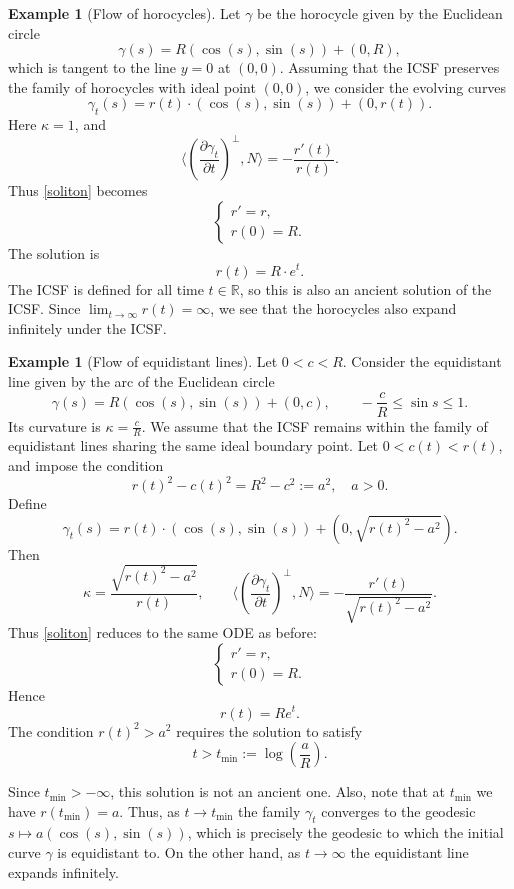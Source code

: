 \documentclass[12pt]{amsart}
\theoremstyle{plain}
\theoremstyle{definition}
\newtheorem{example}[theorem]{Example}
\def\r{\mathbb R}
\begin{document}
\begin{example}[Flow of horocycles]
\label{ex:circle2}
Let $\gamma$ be the horocycle given by the Euclidean circle
$$\gamma(s)=R ( \cos(s),\sin(s))+(0,R),$$
which is tangent to the line $y=0$ at $(0,0)$. Assuming that the ICSF preserves the family of horocycles with ideal point $(0,0)$, we consider the evolving curves
 $$\gamma_t(s) = r(t) \cdot (\cos(s), \sin(s))+(0,r(t)).$$ 
Here $\kappa=1$, and 
$$\langle\left(\frac{\partial \gamma_t}{\partial t}\right)^\perp,  N \rangle = -\frac{r'(t)}{r(t)}.$$ 
Thus \eqref{soliton} becomes
\begin{equation*}
\begin{cases}
r' = r, \\
r(0) = R.
\end{cases}
\end{equation*}
The solution is $$r(t) = R\cdot e^t.$$
The ICSF is defined for all time $t\in\r$, so this is also an ancient solution of the ICSF. Since $\lim_{t\to\infty}r(t) = \infty$, we see that the horocycles also expand infinitely under the ICSF. 
\end{example} 


\begin{example}[Flow of equidistant lines]
\label{ex:circle3}
Let $0<c<R$. Consider the equidistant line given by the arc of the Euclidean circle 
$$\gamma(s)=R\left( \cos(s),\sin(s)\right)+(0,c),\qquad -\frac{c}{R}\leq \sin s\leq 1.$$
Its curvature is $\kappa=\frac{c}{R}$. We assume that the ICSF remains within the family of equidistant lines sharing the same ideal boundary point. Let $0<c(t)<r(t)$, and impose the condition 
$$r(t)^2-c(t)^2=R^2-c^2:=a^2,\quad a>0.$$
Define
$$\gamma_t(s) = r(t) \cdot (\cos(s),\sin(s))+(0, \sqrt{r(t)^2-a^2} ).$$ 
Then 
$$\kappa=\frac{\sqrt{r(t)^2-a^2}}{r(t)},\qquad \langle\left(\frac{\partial \gamma_t}{\partial t}\right)^\perp , N \rangle =- \frac{r'(t)}{\sqrt{r(t)^2-a^2}}.$$
Thus \eqref{soliton} reduces to the same ODE as before: 
\begin{equation*}
\begin{cases}
r' = r, \\
r(0) = R.
\end{cases}
\end{equation*}
Hence $$r(t) = Re^t.$$ 
The condition $r(t)^2>a^2$ requires the solution to satisfy
$$t > t_{\text{min}} := \log\left(\frac{a}{R}\right).$$

Since $t_{\text{min}} > - \infty$, this solution is not an ancient one. Also, note that at $t_{\text{min}}$ we have $r(t_{\text{min}}) = a$. Thus, as $t \to t_{\text{min}}$ the family $\gamma_t$ converges to the geodesic $s \mapsto a(\cos(s), \sin(s))$, which is precisely the geodesic to which the initial curve $\gamma$ is equidistant to. On the other hand, as $t \to \infty$ the equidistant line expands infinitely. 
\end{example} 
\end{document}
